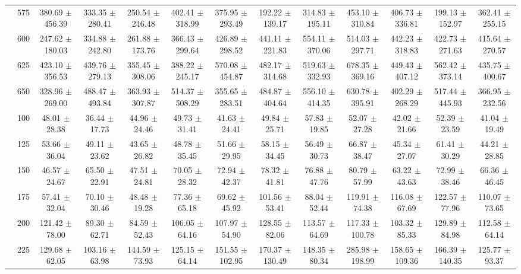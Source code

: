 \begin{table}[h]
{\begin{tabular}{
        ccccccccccccc}
 & 575& 380.69 $\pm$ 456.39& 333.35 $\pm$ 280.41& 250.54 $\pm$ 246.48& 402.41 $\pm$ 318.99& 375.95 $\pm$ 293.49& 192.22 $\pm$ 139.17& 314.83 $\pm$ 195.11& 453.10 $\pm$ 310.84& 406.73 $\pm$ 336.81& 199.13 $\pm$ 152.97& 362.41 $\pm$ 255.15 \\ 
 & 600& 247.62 $\pm$ 180.03& 334.88 $\pm$ 242.80& 261.88 $\pm$ 173.76& 366.43 $\pm$ 299.64& 426.89 $\pm$ 298.52& 441.11 $\pm$ 221.83& 554.11 $\pm$ 370.06& 514.03 $\pm$ 297.71& 442.23 $\pm$ 318.83& 422.73 $\pm$ 271.63& 415.64 $\pm$ 270.57 \\ 
 & 625& 423.10 $\pm$ 356.53& 439.76 $\pm$ 279.13& 355.45 $\pm$ 308.06& 388.22 $\pm$ 245.17& 570.08 $\pm$ 454.87& 482.17 $\pm$ 314.68& 519.63 $\pm$ 332.93& 678.35 $\pm$ 369.16& 449.43 $\pm$ 407.12& 562.42 $\pm$ 373.14& 435.75 $\pm$ 400.67 \\ 
 & 650& 328.96 $\pm$ 269.00& 488.47 $\pm$ 493.84& 363.93 $\pm$ 307.87& 514.37 $\pm$ 508.29& 355.65 $\pm$ 283.51& 484.87 $\pm$ 404.64& 556.10 $\pm$ 414.35& 630.78 $\pm$ 395.91& 402.29 $\pm$ 268.29& 517.44 $\pm$ 445.93& 366.95 $\pm$ 232.56 \\ \hline 
 & 100& 48.01 $\pm$ 28.38& 36.44 $\pm$ 17.73& 44.96 $\pm$ 24.46& 49.73 $\pm$ 31.41& 41.63 $\pm$ 24.41& 49.84 $\pm$ 25.71& 57.83 $\pm$ 19.85& 52.07 $\pm$ 27.28& 42.02 $\pm$ 21.66& 52.39 $\pm$ 23.59& 41.04 $\pm$ 19.49 \\ 
 & 125& 53.66 $\pm$ 36.04& 49.11 $\pm$ 23.62& 43.65 $\pm$ 26.82& 48.78 $\pm$ 35.45& 51.66 $\pm$ 29.95& 58.15 $\pm$ 34.45& 56.49 $\pm$ 30.73& 66.87 $\pm$ 38.47& 45.34 $\pm$ 27.07& 61.41 $\pm$ 30.29& 44.21 $\pm$ 28.85 \\ 
 & 150& 46.57 $\pm$ 24.67& 65.50 $\pm$ 22.91& 47.51 $\pm$ 24.81& 70.05 $\pm$ 28.32& 72.94 $\pm$ 42.37& 78.32 $\pm$ 41.81& 76.88 $\pm$ 47.76& 80.79 $\pm$ 57.99& 63.22 $\pm$ 43.63& 72.99 $\pm$ 38.46& 66.36 $\pm$ 46.45 \\ 
 & 175& 57.41 $\pm$ 32.04& 70.10 $\pm$ 30.46& 48.48 $\pm$ 19.28& 77.36 $\pm$ 65.18& 69.62 $\pm$ 45.92& 101.56 $\pm$ 53.41& 88.04 $\pm$ 52.44& 119.91 $\pm$ 74.38& 116.08 $\pm$ 67.69& 122.57 $\pm$ 77.96& 110.07 $\pm$ 73.65 \\ 
 & 200& 121.42 $\pm$ 78.00& 89.30 $\pm$ 62.71& 84.59 $\pm$ 52.43& 106.05 $\pm$ 64.16& 107.97 $\pm$ 54.90& 128.55 $\pm$ 82.06& 113.57 $\pm$ 64.69& 117.33 $\pm$ 100.78& 103.32 $\pm$ 85.33& 129.89 $\pm$ 84.98& 112.58 $\pm$ 64.14 \\ 
 & 225& 129.68 $\pm$ 62.05& 103.16 $\pm$ 63.98& 144.59 $\pm$ 73.93& 125.15 $\pm$ 64.14& 151.55 $\pm$ 102.95& 170.37 $\pm$ 130.49& 148.35 $\pm$ 80.34& 285.98 $\pm$ 198.99& 158.65 $\pm$ 109.36& 166.39 $\pm$ 140.35& 125.77 $\pm$ 93.37 \\ 

\end{tabular}}
\end{table}
